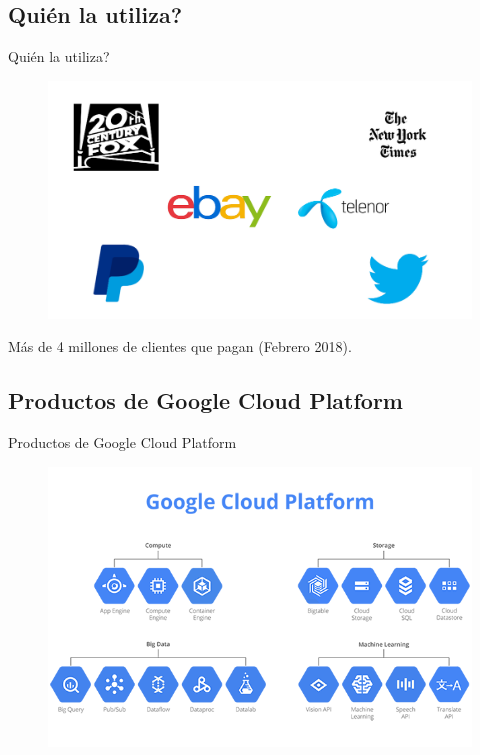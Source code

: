 \documentclass{beamer}
\begin{document}
\subsection{Quién la utiliza?}

\begin{frame}[fragile]{Quién la utiliza?}
\begin{figure}[H]
  \centering
  \includegraphics[width =\textwidth]{project/logos.png}
\end{figure}
Más de 4 millones de clientes que pagan (Febrero 2018).
\end{frame}

\subsection{Productos de Google Cloud Platform}

\begin{frame}[fragile]{Productos de Google Cloud Platform}
\begin{figure}[H]
  \centering
  \includegraphics[width =\textwidth]{project/gcp_products.png}
\end{figure}
\end{frame}
\end{document}
